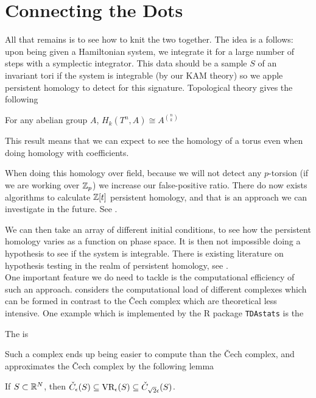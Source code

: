\documentclass{article}
\begin{document}
\section{Connecting the Dots}
All that remains is to see how to knit the two together. The idea is a follows: upon being given a Hamiltonian system, we integrate it for a large number of steps with a symplectic integrator. This data should be a sample $S$ of an invariant tori if the system is integrable (by our KAM theory) so we apple persistent homology to detect for this signature. Topological theory gives the following
\begin{lemma}
	For any abelian group $A$, $H_k(T^n,A) \cong A^{n \choose k}$
\end{lemma}
This result means that we can expect to see the homology of a torus even when doing homology with coefficients.
\begin{remark}
	When doing this homology over field, because we will not detect any $p$-torsion (if we are working over $\mathbb{Z}_p$) we increase our false-positive ratio. There do now exists algorithms to calculate $\mathbb{Z}[t]$ persistent homology, and that is an approach we can investigate in the future. See \cite{romero2014}.
\end{remark}
 We can then take an array of different initial conditions, to see how the persistent homology varies as a function on phase space. It is then not impossible doing a hypothesis to see if the system is integrable. There is existing literature on hypothesis testing in the realm of persistent homology, see \cite{Robinson2017,fasy2014}. \\
 One important feature we do need to tackle is the computational efficiency of such an approach. \cite{Otter2017} considers the computational load of different complexes which can be formed in contrast to the \v{C}ech complex which are theoretical less intensive. One example which is implemented by the R package \texttt{TDAstats} is the 
 
\begin{definition}
	The  is 
\end{definition}

Such a complex ends up being easier to compute than the \v{C}ech complex, and approximates the \v{C}ech complex by the following lemma

\begin{lemma}
	If $S \subset \mathbb{R}^N$, then $\check{C}_\epsilon(S) \subseteq \text{VR}_\epsilon(S) \subseteq \check{C}_{\sqrt{2}\epsilon}(S)$.
\end{lemma}
\end{document}

